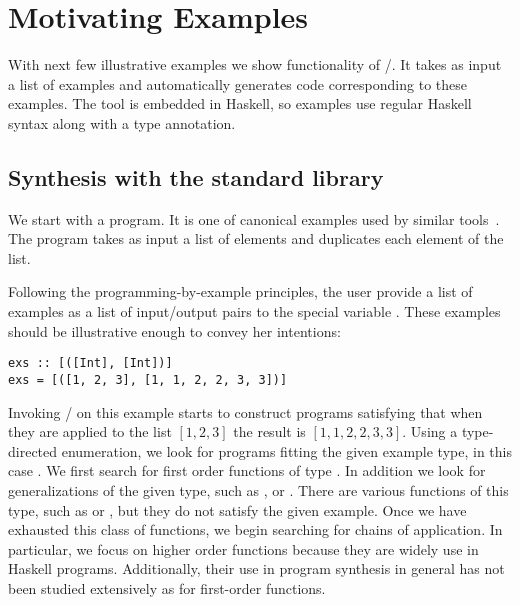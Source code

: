 \section{Motivating Examples} 
\label{examples}

With next few illustrative examples we show functionality of \ourTool/.
It takes as input a list of examples and automatically generates code
corresponding to these examples. The tool is embedded in Haskell, so examples use regular Haskell syntax along with a type annotation.



\subsection{Synthesis with the standard library}

We start with a  program. It is one of canonical 
examples used by similar tools~\cite{Osera:2016}. The  program takes as input a list of elements and duplicates each element 
of the list.
 
Following the programming-by-example principles, the user 
provide a list of examples as a list of input/output pairs to the special variable . These examples should be
illustrative enough to convey her intentions:

\begin{lstlisting}
exs :: [([Int], [Int])]
exs = [([1, 2, 3], [1, 1, 2, 2, 3, 3])]
\end{lstlisting}

Invoking \ourTool/ on this example starts to construct programs  satisfying that when they are applied to the list $[1, 2, 3]$ the result 
is $[1, 1, 2, 2, 3, 3]$.
Using a type-directed enumeration, we look for programs fitting the given example type, in this case \codeinline{[Int]->[Int]}.
We first search for first order functions of type \codeinline{[Int]->[Int]}.
In addition we look for generalizations of the given type, such as \codeinline{[a]->[a]}, or .
There are various functions of this type, such as  or , but they do not satisfy the given example.
Once we have exhausted this class of functions, we begin searching for chains of application.
In particular, we focus on higher order functions because they are widely use in Haskell programs. Additionally, their use in program synthesis 
in general has not been studied extensively as for first-order functions.

